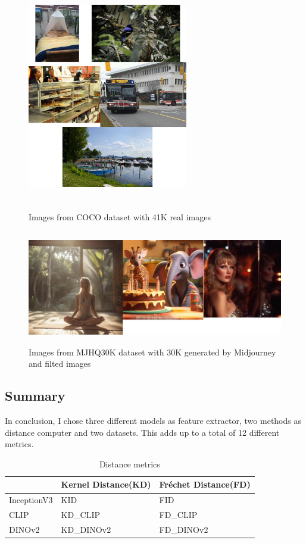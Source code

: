 \begin{figure}[hbt]
\centering
\includegraphics[width=7cm, height=10cm]{figs/coco_examples.png}
\caption{Images from COCO dataset with 41K real images}
\label{fig:COCO_examples}
\end{figure}

\begin{figure}[hbt]
\centering
\includegraphics[width=12cm, height=5cm]{figs/mjhq30k_examples.png}
\caption{Images from MJHQ30K dataset with 30K generated by Midjourney and filted images}
\label{fig:MJHQ30k_examples}
\end{figure}

\subsection{Summary}
In conclusion, I chose three different models as feature extractor, two methods as distance computer and two datasets. This adds up to a total of 12 different metrics.\\
\begin{table}[h]
\centering
\begin{tabularx}{0.8\textwidth} { 
  | >{\centering\arraybackslash}X 
  | >{\centering\arraybackslash}X 
  | >{\centering\arraybackslash}X | }
 \hline
  & Kernel Distance(KD) & Fréchet Distance(FD) \\
 \hline
 InceptionV3  & KID  & FID  \\
 \hline
 CLIP  & KD\_CLIP  & FD\_CLIP  \\
\hline
 DINOv2  & KD\_DINOv2  & FD\_DINOv2  \\
\hline
\end{tabularx}
\caption{Distance metrics}
\label{tab:distance_metrics}
\end{table}
